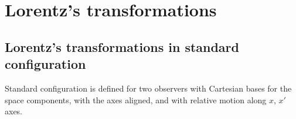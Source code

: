 \documentclass[letterpaper,10pt,english]{jupyterBook}
\begin{document}
\section{Lorentz’s transformations}
\label{\detokenize{ch/relativity-special/lorentz:lorentz-s-transformations}}\label{\detokenize{ch/relativity-special/lorentz:relativity-special-lorentz-transformation}}

\subsection{Lorentz’s transformations in standard configuration}
\label{\detokenize{ch/relativity-special/lorentz:lorentz-s-transformations-in-standard-configuration}}\label{\detokenize{ch/relativity-special/lorentz:relativity-special-lorentz-transformation-std}}
\sphinxAtStartPar
Standard configuration is defined for two observers with Cartesian bases for the space components, with the axes aligned, and with relative motion along \(x\), \(x'\) axes.
\end{document}
